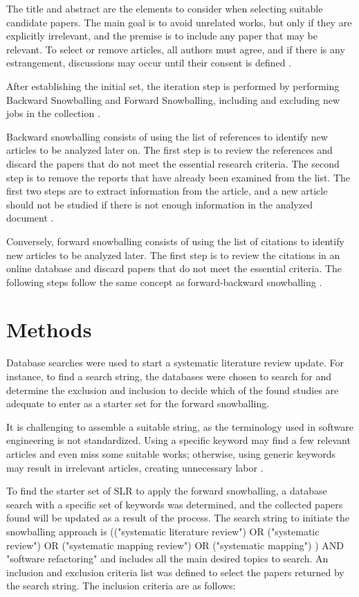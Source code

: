 The title and abstract are the elements to consider when selecting suitable candidate papers. The main goal is to avoid unrelated works, but only if they are explicitly irrelevant, and the premise is to include any paper that may be relevant. To select or remove articles, all authors must agree, and if there is any estrangement, discussions may occur until their consent is defined \textcite{Kitchenham2013}.

After establishing the initial set, the iteration step is performed by performing Backward Snowballing and Forward Snowballing, including and excluding new jobs in the collection \cite{Wohlin2014}.

Backward snowballing consists of using the list of references to identify new articles to be analyzed later on. The first step is to review the references and discard the papers that do not meet the essential research criteria. The second step is to remove the reports that have already been examined from the list. The first two steps are to extract information from the article, and a new article should not be studied if there is not enough information in the analyzed document \cite{Wohlin2014}.

Conversely, forward snowballing consists of using the list of citations to identify new articles to be analyzed later. The first step is to review the citations in an online database and discard papers that do not meet the essential criteria. The following steps follow the same concept as forward-backward snowballing \cite{Felizardo2016}.

\section{Methods}
\label{sec-methods}
Database searches were used to start a systematic literature review update. For instance, to find a search string, the databases were chosen to search for and determine the exclusion and inclusion to decide which of the found studies are adequate to enter as a starter set for the forward snowballing.

It is challenging to assemble a suitable string, as the terminology used in software engineering is not standardized. Using a specific keyword may find a few relevant articles and even miss some suitable works; otherwise, using generic keywords may result in irrelevant articles, creating unnecessary labor \cite{Wohlin2014}.

To find the starter set of SLR to apply the forward snowballing, a database search with a specific set of keywords was determined, and the collected papers found will be updated as a result of the process. The search string to initiate the snowballing approach is (("systematic literature review") OR ("systematic review") OR ("systematic mapping review") OR ("systematic mapping") ) AND "software refactoring" and includes all the main desired topics to search. An inclusion and exclusion criteria list was defined to select the papers returned by the search string. The inclusion criteria are as follows:

